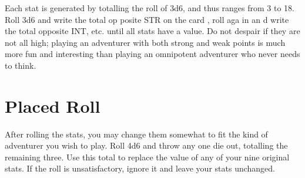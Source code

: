\begin{multicols*}{2}
Each stat is generated by totalling the roll of 3d6, and thus ranges from 3 to 18. Roll 3d6 and write the total op posite STR on the card , roll aga in an d write the total opposite INT, etc. until all stats have a value. Do not despair if they are not all high; playing an adventurer with both strong and weak points is much more fun and interesting than playing an omnipotent adventurer who never needs to think.
\section{Placed Roll}
After rolling the stats, you may change them somewhat to fit the kind of adventurer you wish to play. Roll 4d6 and throw any one die out, totalling the remaining three. Use this total to replace the value of any of your nine original stats. If the roll is unsatisfactory, ignore it and leave your stats unchanged.

\end{multicols*}
